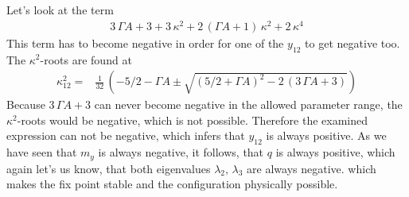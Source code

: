 \documentclass{article}
\begin{document}
Let's look at the term 
\begin{align*}
    3\,\Gamma A +3 +3\,\kappa^2+2\,(\Gamma A+1)\,\kappa^2+2\,\kappa^4
\end{align*}
This term has to become negative in order for one of the $y_{12}$ to get negative too. The $\kappa^2$-roots are found at
\begin{align*}
    \kappa^2_{12}=&\frac{1}{32}\,(-5/2-\Gamma A\pm\sqrt{(5/2+\Gamma A)^2-2\,(3\,\Gamma A+3)})
\end{align*}
Because $3\,\Gamma A+3$ can never become negative in the allowed parameter range, the $\kappa^2$-roots would be negative, which is not possible. Therefore the examined expression can not be negative, which infers that $y_{12}$ is always positive. As we have seen that $m_y$ is always negative, it follows, that $q$ is always positive, which again let's us know, that both eigenvalues $\lambda_{2},\,\lambda_3$ are always negative. which makes the fix point stable and the configuration physically possible.\\\\
\end{document}
